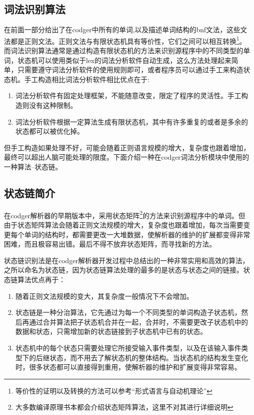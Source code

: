 \documentclass[a4paper,11pt]{article}
\begin{document}
\begin{CJK}{UTF8}{gbsn}
\section{词法识别算法}
在前面一部分给出了在codger中所有的单词,以及描述单词结构的bnf文法，这些文法都是正则文法。正则文法与有限状态机具有等价性，它们之间可以相互转换\footnote{等价性的证明以及转换的方法可以参考``形式语言与自动机理论''}。而词法识别算法通常是通过构造有限状态机的方法来识别源程序中的不同类型的单词，状态机可以使用类似于lex的词法分析软件自动生成，这么方法处理起来简单，只需要遵守词法分析软件的使用规则即可，或者程序员可以通过手工来构造状态机。手工构造相比词法分析软件相比优点在于:
\begin{enumerate}
 \item 词法分析软件有固定处理框架，不能随意改变，限定了程序的灵活性。手工构造则没有这种限制。
 \item 词法分析软件根据一定算法生成有限状态机，其中有许多重复的或者是多余的状态都可以被优化掉。
\end{enumerate}
但手工构造如果处理不好，可能会随着正则语言规模的增大，复杂度也跟着增加，最终可以超出人脑可能处理的限度。下面介绍一种在codger词法分析模块中使用的一种算法--状态链。
\subsection{状态链简介}
在codger解析器的早期版本中，采用状态矩阵\footnote{大多数编译原理书本都会介绍状态矩阵算法，这里不对其进行详细说明}的方法来识别源程序中的单词。但由于状态矩阵算法会随着正则文法规模的增大，复杂度也跟着增加，每次当需要变更每个单词的结构时，都需要更改一大堆数据，使解析器的维护的扩展都变得非常困难，而且极容易出错。最后不得不放弃状态矩阵，而寻找新的方法。

状态链识别法是在codger解析器开发过程中总结出的一种非常实用和高效的算法，之所以命名为状态链，因为状态链算法处理的最多的是状态与状态之间的链接。状态链算法优点再于：
\begin{enumerate}
 \item 随着正则文法规模的变大，其复杂度一般情况下不会增加。
 \item 状态链是一种分治算法，它先通过为每一个不同类型的单词构造子状态机，然后再通过合并算法把子状态机合并在一起，合并时，不需要更改子状态机中的数据和状态，只需增加新的状态链接到子状态机中已有的状态。
 \item 状态机中的每个状态只需要处理它所接受输入事件类型，以及在该输入事件类型下的后继状态，而不用去了解状态机的整体结构。当状态机的结构发生变化时，很多状态都可以直接得到重用，使解析器的维护和扩展变得非常容易。
\end{enumerate}

\end{CJK}
\end{document}
